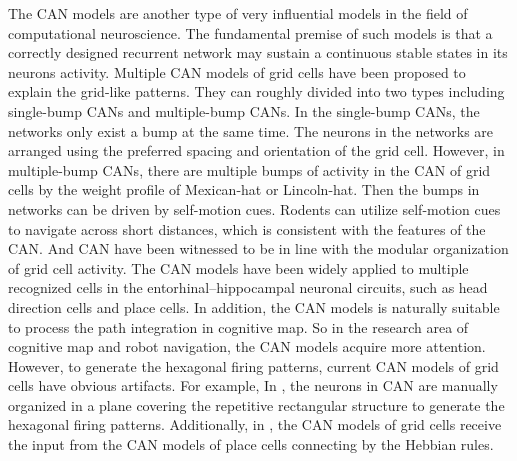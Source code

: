 \documentclass[final,5p,times,twocolumn,authoryear]{elsarticle}
\begin{document}
The CAN models are another type of very influential models in the field of computational neuroscience. The fundamental premise of such models is that a correctly designed recurrent network may sustain a continuous stable states in its neurons activity\citep{Taylor1999,Amari1977}. Multiple CAN models of grid cells have been proposed to explain the grid-like patterns\citep{Fuhs2006,Burak2009,Guanella2007,Shipston-Sharman2016,Couey2013}. They can roughly divided into two types including single-bump CANs and multiple-bump CANs. In the single-bump CANs, the networks only exist a bump at the same time\citep{Guanella2007}. The neurons in the networks are arranged using the preferred spacing and orientation of the grid cell. However, in multiple-bump CANs, there are multiple bumps of activity in the CAN of grid cells by the weight profile of Mexican-hat or Lincoln-hat\citep{Rowland2016}. Then the bumps in networks can be driven by self-motion cues. Rodents can utilize self-motion cues to navigate across short distances, which is consistent with the features of the CAN. And CAN have been witnessed to be in line with the modular organization of grid cell activity\citep{Stensola2012,Yoon2013}. The CAN models have been widely applied to multiple recognized cells in the entorhinal–hippocampal neuronal circuits, such as head direction cells and place cells. In addition, the CAN models is naturally suitable to process the path integration in cognitive map. So in the research area of cognitive map and robot navigation, the CAN models acquire more attention. However, to generate the hexagonal firing patterns, current CAN models of grid cells have obvious artifacts. For example, In \citep{Guanella2007}, the neurons in CAN are manually organized in a plane covering the repetitive rectangular structure to generate the hexagonal firing patterns. Additionally, in \citep{Guanella2007}, the CAN models of grid cells receive the input from the CAN models of place cells connecting by the Hebbian rules.

\end{document}
